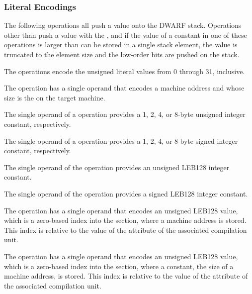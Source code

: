 \subsubsection{Literal Encodings}
\label{chap:literalencodings}
The 
following operations all push a value onto the DWARF
stack. 
Operations other than \DWOPconsttype{} push a value with the 
\generictype, and if the value of a constant in one of these 
operations is larger than can be stored in a single stack element, 
the value is truncated to the element size and the low-order bits
are pushed on the stack.
\begin{enumerate}[1. ]
\itembfnl{\DWOPlitzeroTARG, \DWOPlitoneTARG, \dots, \DWOPlitthirtyoneTARG}
The \DWOPlitnTARG{} operations encode the unsigned literal values
from 0 through 31, inclusive.

\itembfnl{\DWOPaddrTARG}
The \DWOPaddrNAME{} operation has a single operand that encodes
a machine address and whose size is the 
on the target machine.

\itembfnl{\DWOPconstoneuTARG, \DWOPconsttwouTARG, \DWOPconstfouruTARG, \DWOPconsteightuTARG}
\DWOPconstnxMARK{}
The single operand of a \DWOPconstnuNAME{} operation provides a 1,
2, 4, or 8-byte unsigned integer constant, respectively.

\itembfnl{\DWOPconstonesTARG, \DWOPconsttwosTARG, \DWOPconstfoursTARG, \DWOPconsteightsTARG}
The single operand of a \DWOPconstnsNAME{} operation provides a 1,
2, 4, or 8-byte signed integer constant, respectively.

\itembfnl{\DWOPconstuTARG}
The single operand of the \DWOPconstuNAME{} operation provides
an unsigned LEB128 integer constant.

\itembfnl{\DWOPconstsTARG}
The single operand of the \DWOPconstsNAME{} operation provides
a signed LEB128 integer constant.

\itembfnl{\DWOPaddrxTARG}
The \DWOPaddrxNAME{} operation has a single operand that
encodes an unsigned LEB128 value, 
which is a zero-based index into the \dotdebugaddr{} section, 
where a machine address is stored.
This index is relative to the value of the 
\DWATaddrbase{} attribute of the associated compilation unit.

\itembfnl{\DWOPconstxTARG}
The \DWOPconstxNAME{} operation has a single operand that
encodes an unsigned LEB128 value, 
which is a zero-based
index into the \dotdebugaddr{} section, where a constant, the
size of a machine address, is stored.
This index is relative to the value of the 
\DWATaddrbase{} attribute of the associated compilation unit.


\end{enumerate}
